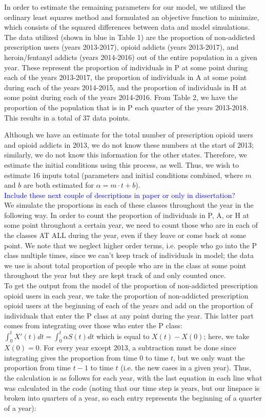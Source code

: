 \documentclass[12pt]{article}
\begin{document}
In order to estimate the remaining parameters for our model, we utilized the ordinary least squares method and formulated an objective function to minimize, which consists of the squared differences between data and model simulations. The data utilized (shown in blue in Table 1) are the proportion of non-addicted prescription users (years 2013-2017), opioid addicts (years 2013-2017), and heroin/fentanyl addicts (years 2014-2016) out of the entire population in a given year. These represent the proportion of individuals in P at some point during each of the years 2013-2017, the proportion of individuals in A at some point during each of the years 2014-2015, and the proportion of individuals in H at some point during each of the years 2014-2016. From Table 2, we have the proportion of the population that is in P each quarter of the years 2013-2018. 
This results in a total of 37 data points.

Although we have an estimate for the total number of prescription opioid users and opioid addicts  in 2013, we do not know these numbers at the start of 2013; similarly, we do not know this information for the other states. Therefore, we estimate the initial conditions using this process, as well. Thus, we wish to estimate 16 inputs total (parameters and initial conditions combined, where $m$ and $b$ are both estimated for $\alpha=m\cdot t + b$). \\


\textcolor{blue}{Include these next couple of descriptions in paper or only in dissertation?} \\
We simulate the proportions in each of these classes throughout the year in the following way. 
In order to count the proportion of individuals in P, A, or H at some point throughout a certain year, 
 we need to count those who are in each of the classes AT ALL during the year, even if they leave or come back at some point. We note that we neglect higher order terms, i.e. people who go into the P class multiple times, since we can't keep track of individuals in model; the data we use is about total proportion of people who are in the class at some point throughout the year but they are kept track of and only counted once. \\
  
To get the output from the model of the proportion of non-addicted prescription opioid users in each year, we take the proportion of non-addicted prescription opioid users at the beginning of each of the years and add on the proportion of individuals that enter the P class at any point during the year. This latter part comes from integrating over those who enter the P class: $\int_0^t X'(t)dt=\int_0^t \alpha S(t)dt$ which is equal to $X(t)-X(0)$; here, we take $X(0)=0.$ For every year except 2013, a subtraction must be done since integrating gives the proportion from time $0$ to time $t$, but we only want the proportion from time $t-1$ to time $t$ (i.e. the new cases in a given year). Thus, the calculation is as follows for each year, with the last equation in each line what was calculated in the code (noting that our time step is years, but our linspace is broken into quarters of a year, so each entry represents the beginning of a quarter of a year): \\
\end{document}
